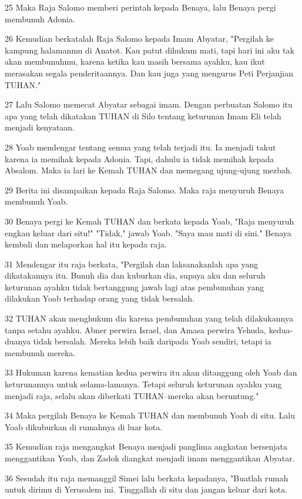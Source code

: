 \par 25 Maka Raja Salomo memberi perintah kepada Benaya, lalu Benaya pergi membunuh Adonia.
\par 26 Kemudian berkatalah Raja Salomo kepada Imam Abyatar, "Pergilah ke kampung halamanmu di Anatot. Kau patut dihukum mati, tapi hari ini aku tak akan membunuhmu, karena ketika kau masih bersama ayahku, kau ikut merasakan segala penderitaannya. Dan kau juga yang mengurus Peti Perjanjian TUHAN."
\par 27 Lalu Salomo memecat Abyatar sebagai imam. Dengan perbuatan Salomo itu apa yang telah dikatakan TUHAN di Silo tentang keturunan Imam Eli telah menjadi kenyataan.
\par 28 Yoab mendengar tentang semua yang telah terjadi itu. Ia menjadi takut karena ia memihak kepada Adonia. Tapi, dahulu ia tidak memihak kepada Absalom. Maka ia lari ke Kemah TUHAN dan memegang ujung-ujung mezbah.
\par 29 Berita ini disampaikan kepada Raja Salomo. Maka raja menyuruh Benaya membunuh Yoab.
\par 30 Benaya pergi ke Kemah TUHAN dan berkata kepada Yoab, "Raja menyuruh engkau keluar dari situ!" "Tidak," jawab Yoab. "Saya mau mati di sini." Benaya kembali dan melaporkan hal itu kepada raja.
\par 31 Mendengar itu raja berkata, "Pergilah dan laksanakanlah apa yang dikatakannya itu. Bunuh dia dan kuburkan dia, supaya aku dan seluruh keturunan ayahku tidak bertanggung jawab lagi atas pembunuhan yang dilakukan Yoab terhadap orang yang tidak bersalah.
\par 32 TUHAN akan menghukum dia karena pembunuhan yang telah dilakukannya tanpa setahu ayahku. Abner perwira Israel, dan Amasa perwira Yehuda, kedua-duanya tidak bersalah. Mereka lebih baik daripada Yoab sendiri, tetapi ia membunuh mereka.
\par 33 Hukuman karena kematian kedua perwira itu akan ditanggung oleh Yoab dan keturunannya untuk selama-lamanya. Tetapi seluruh keturunan ayahku yang menjadi raja, selalu akan diberkati TUHAN--mereka akan beruntung."
\par 34 Maka pergilah Benaya ke Kemah TUHAN dan membunuh Yoab di situ. Lalu Yoab dikuburkan di rumahnya di luar kota.
\par 35 Kemudian raja mengangkat Benaya menjadi panglima angkatan bersenjata menggantikan Yoab, dan Zadok diangkat menjadi imam menggantikan Abyatar.
\par 36 Sesudah itu raja memanggil Simei lalu berkata kepadanya, "Buatlah rumah untuk dirimu di Yerusalem ini. Tinggallah di situ dan jangan keluar dari kota.
